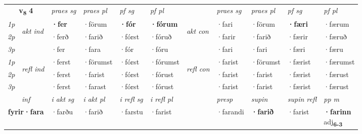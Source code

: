 \noindent
\begin{tabular}{lllllllllll} \toprule
\multicolumn{2}{c}{\textbf{v{\textsubscript{8}}} \Large{\textbf{4}}}  &  \textit{praes sg}  & \textit{praes pl}  &\textit{ pf sg} & \textit{pf pl} &  &  \textit{praes sg}  & \textit{praes pl}  & \textit{pf sg} & \textit{pf pl } \\*
	\cmidrule{3-6} \cmidrule{8-11}
 {\textit{1p}} & \multirow{3}{*}{\begin{turn}{90}\textit{akt ind}\end{turn}} & \textbf{·fer} & ·förum & \textbf{·fór} & \textbf{·fórum} & \multirow{3}{*}{\begin{turn}{90}\textit{akt con}\end{turn}} &·fari & ·förum & \textbf{·færi} & ·færum\\*
 {\textit{2p}} &  &  ·ferð  & ·farið & ·fórst & ·fóruð & & ·farir & ·farið & ·færir & ·færuð \\*
{\textit{3p}} &  & ·fer & ·fara & ·fór & ·fóru & & ·fari & ·fari& ·færi & ·færu \\*
\cmidrule{3-6} \cmidrule{8-11}
 {\textit{1p}} & \multirow{3}{*}{\begin{turn}{90}\textit{refl ind}\end{turn}}  & ·ferst & ·förumst & ·fórst & ·fórumst & \multirow{3}{*}{\begin{turn}{90}\textit{refl con}\end{turn}}  &·farist & ·förumst & ·færist & ·færumst \\*
 {\textit{2p}} &  & ·ferst & ·farist & ·fórst & ·fórust & &·farist & ·farist & ·færist & ·færust \\*
 {\textit{3p}}  & & ·ferst & ·farast & ·fórst & ·fórust & & ·farist & ·farist& ·færist & ·færust \\*
\cmidrule{3-6} \cmidrule{8-11}

   \multicolumn{2}{c}{\textit{inf}}  & \textit{i akt sg} & \textit{i akt pl} & \textit{i refl sg} & \textit{i refl pl} && \textit{presp} & \textit{supin} & \textit{supin refl} & \textit{pp m} \\*
  \multicolumn{2}{c}{\textbf{fyrir\allowbreak ·fara}} & ·farðu  & ·farið & ·farstu & ·farist && ·farandi &  \textbf{·farið} & ·farist & \specialcell{\textbf{·farinn} \\ adj\textbf{\textsubscript{6-3}}} \\*
\end{tabular}

